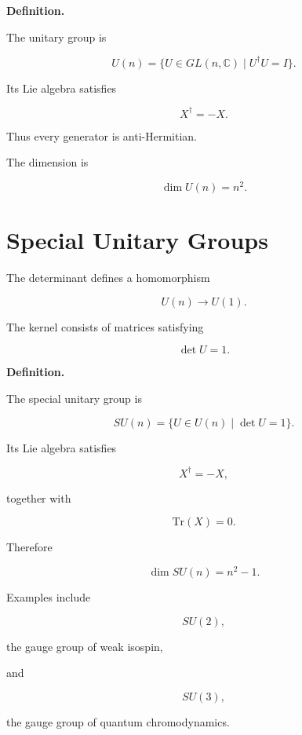 \textbf{Definition.}

The unitary group is

\[
U(n)
=
\{
U
\in
GL(n,\mathbb C)
\;|\;
U^\dagger U=I
\}.
\]


Its Lie algebra satisfies

\[
X^\dagger
=
-X.
\]

Thus every generator is anti-Hermitian.


The dimension is

\[
\boxed{
\dim U(n)=n^2.
}
\]

\section{Special Unitary Groups}

The determinant defines a homomorphism

\[
U(n)
\rightarrow
U(1).
\]

The kernel consists of matrices satisfying

\[
\det U=1.
\]


\textbf{Definition.}

The special unitary group is

\[
SU(n)
=
\{
U
\in
U(n)
\;|\;
\det U=1
\}.
\]

Its Lie algebra satisfies

\[
X^\dagger=-X,
\]

together with

\[
\mathrm{Tr}(X)=0.
\]


Therefore

\[
\boxed{
\dim SU(n)
=
n^2-1.
}
\]


Examples include

\[
SU(2),
\]

the gauge group of weak isospin,

and

\[
SU(3),
\]

the gauge group of quantum chromodynamics.

